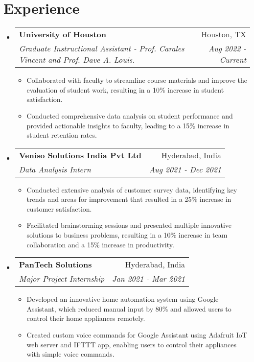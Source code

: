 \documentclass[letterpaper,10.8pt]{article}
\makeatletter
\newcommand{\resumeSubheading}[4]{
  \vspace{-1pt}\item
    \begin{tabular*}{0.97\textwidth}{l@{\extracolsep{\fill}}r}
      \textbf{#1} & #2 \\
      \textit{\small#3} & \textit{\small #4} \\
    \end{tabular*}\vspace{-5pt}
}
\newcommand{\resumeSubHeadingListStart}{\begin{itemize}[leftmargin=*]}
\newcommand{\resumeSubHeadingListEnd}{\end{itemize}}
\newcommand{\resumeItemListStart}{\begin{itemize}}
\newcommand{\resumeItemListEnd}{\end{itemize}\vspace{-5pt}}
\makeatother
\begin{document}
\section{Experience}
  \resumeSubHeadingListStart
    \resumeSubheading
    {University of Houston}{Houston, TX}
    {Graduate Instructional Assistant - Prof. Carales Vincent and Prof. Dave A. Louis.}{Aug 2022 -  Current}
    \resumeItemListStart
        \item{Collaborated with faculty to streamline course materials and improve the evaluation of student work, resulting in a 10\% increase in student satisfaction.}
        \item{Conducted comprehensive data analysis on student performance and provided actionable insights to faculty, leading to a 15\% increase in student retention rates.}
      \resumeItemListEnd
    \resumeSubheading
    {Veniso Solutions India Pvt Ltd}{Hyderabad, India} {Data Analysis Intern}{Aug 2021 - Dec 2021} \resumeItemListStart 
    \item{Conducted extensive analysis of customer survey data, identifying key trends and areas for improvement that resulted in a 25\% increase in customer satisfaction.}
    \item {Facilitated brainstorming sessions and presented multiple innovative solutions to business problems, resulting in a 10\% increase in team collaboration and a 15\% increase in productivity.}
        
    \resumeItemListEnd
    
    \resumeSubheading
    {PanTech Solutions}{Hyderabad, India}
    {Major Project Internship}{Jan 2021 - Mar 2021}
    \resumeItemListStart
        \item{Developed an innovative home automation system using Google Assistant, which reduced manual input by 80\% and allowed users to control their home appliances remotely.}
        \item {Created custom voice commands for Google Assistant using Adafruit IoT web server and IFTTT app, enabling users to control their appliances with simple voice commands.}
    
    \resumeItemListEnd
\resumeSubHeadingListEnd



\end{document}
